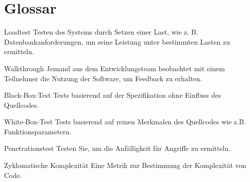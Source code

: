 \section{Glossar}

	\begin{description}
	\item{Loadtest} Testen des Systems durch Setzen einer Last, wie z. B. Datenbankanforderungen, um seine Leistung unter bestimmten Lasten zu ermitteln.
	\end{description}
	
	\begin{description}
    \item{Walkthrough} Jemand aus dem Entwicklungsteam beobachtet mit einem Teilnehmer die Nutzung der Software, um Feedback zu erhalten.
    \end{description}
    
    \begin{description}
    \item{Black-Box-Test} Tests basierend auf der Spezifikation ohne Einfluss des Quellcodes.
    \end{description}
    
    \begin{description}
    \item{White-Box-Test} Tests basierend auf reinen Merkmalen des Quellcodes wie z.B. 
    Funktionsparametern.
    \end{description}
    
    \begin{description}
    \item{Penetrationstest} Testen Sie, um die Anfälligkeit für Angriffe zu ermitteln.
    \end{description}
    
    \begin{description}
    \item{Zyklomatische Komplexität} Eine Metrik zur Bestimmung der Komplexität von Code.
	\end{description}
